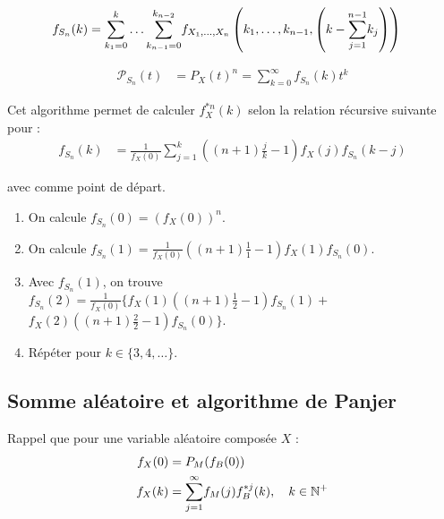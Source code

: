 \documentclass[10pt, french]{article}
\begin{document}
\begin{multicols*}{2}
\begin{align*}
	f_{S_{n}}(k)
	&=	\overset{k}{\underset{k_{1}	=	0}{\sum}}\dots\overset{k_{n	-	2}}{\underset{k_{n	-	1}	=	0}{\sum}} 
	f_{X_{1}, \dots, X_{n}}\left(k_{1}, \dots, k_{n - 1}, \left(k - \overset{n	-	1}{\underset{j	=	1}{\sum}}k_{j} \right) \right)
\end{align*}

\begin{align*}
	\mathcal{P}_{S_{n}}(t)
	&=	P_{X}(t)^{n}	
	=	\sum_{k = 0}^{\infty} f_{S_{n}}(k) t^{k}
\end{align*}

\begin{algo2}
Cet algorithme permet de calculer $f_{X}^{\ast n}(k)$ selon la relation récursive suivante pour  :
\begin{align*}
	f_{S_{n}}(k)
	&=	\frac{1}{f_{X}(0)} \sum_{j = 1}^{k} \left((n + 1)\frac{j}{k} - 1\right)f_{X}(j)f_{S_{n}}(k - j)
\end{align*}

avec  comme point de départ.

\tcbline

\begin{enumerate}
	\item	On calcule $f_{S_{n}}(0)	=	\left(f_{X}(0)\right)^{n}$.
	\item	On calcule $f_{S_{n}}(1)	=	\frac{1}{f_{X}(0)} \left((n + 1)\frac{1}{1} - 1\right)f_{X}(1)f_{S_{n}}(0)$.
	\item	Avec $f_{S_{n}}(1)$, on trouve $f_{S_{n}}(2)	=	\frac{1}{f_{X}(0)} \bigg\{ f_{X}(1)\left((n + 1)\frac{1}{2} - 1\right)f_{S_{n}}(1)	+$ $ f_{X}(2)\left((n + 1)\frac{2}{2} - 1\right)f_{S_{n}}(0) \bigg\}$.
	\item	Répéter pour $k \in \{3, 4, \dots\}$.
\end{enumerate}
\end{algo2}

\columnbreak
\subsection{Somme aléatoire et algorithme de Panjer}
Rappel que pour une variable aléatoire composée $X$ : 
\begin{align*}
	f_{X}(0)
	&=	P_{M}(f_{B}(0))	\\
	f_{X}(k)
	&=	\overset{\infty}{\underset{j	=	1}{\sum}} f_{M}(j)f_{B}^{\ast j}(k), \quad k \in \mathbb{N}^{+}	
\end{align*}


\end{multicols*}
\end{document}
